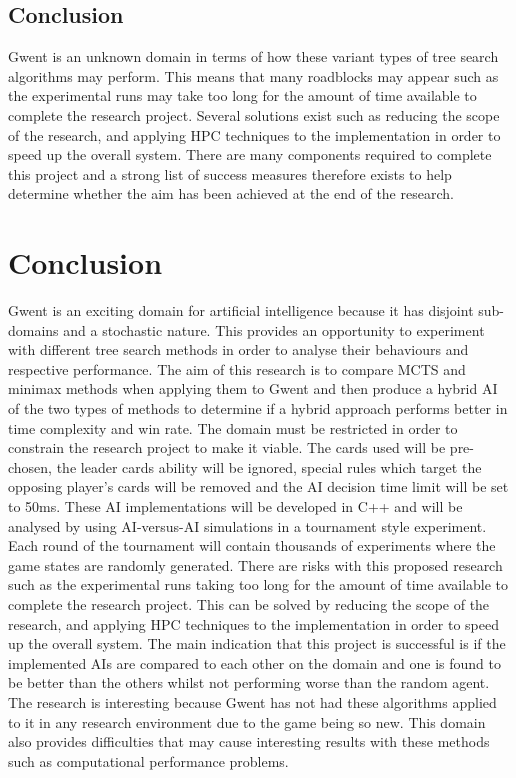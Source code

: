 \documentclass [11pt]{article}
\begin{document}
	\subsection{Conclusion}
	Gwent is an unknown domain in terms of how these variant types of tree search algorithms may perform. This means that many roadblocks may appear such as the experimental runs may take too long for the amount of time available to complete the research project. Several solutions exist such as reducing the scope of the research, and applying HPC techniques to the implementation in order to speed up the overall system. There are many components required to complete this project and a strong list of success measures therefore exists to help determine whether the aim has been achieved at the end of the research.
	
	\section{Conclusion}
	Gwent is an exciting domain for artificial intelligence because it has disjoint sub-domains and a stochastic nature. This provides an opportunity to experiment with different tree search methods in order to analyse their behaviours and respective performance. The aim of this research is to compare MCTS and minimax methods when applying them to Gwent and then produce a hybrid AI of the two types of methods to determine if a hybrid approach performs better in time complexity and win rate. The domain must be restricted in order to constrain the research project to make it viable. The cards used will be pre-chosen, the leader cards ability will be ignored, special rules which target the opposing player's cards will be removed and the AI decision time limit will be set to 50ms. These AI implementations will be developed in C++ and will be analysed by using AI-versus-AI simulations in a tournament style experiment. Each round of the tournament will contain thousands of experiments where the game states are randomly generated. There are risks with this proposed research such as the experimental runs taking too long for the amount of time available to complete the research project. This can be solved by reducing the scope of the research, and applying HPC techniques to the implementation in order to speed up the overall system. The main indication that this project is successful is if the implemented AIs are compared to each other on the domain and one is found to be better than the others whilst not performing worse than the random agent. The research is interesting because Gwent has not had these algorithms applied to it in any research environment due to the game being so new. This domain also provides difficulties that may cause interesting results with these methods such as computational performance problems.
	
\end{document}
